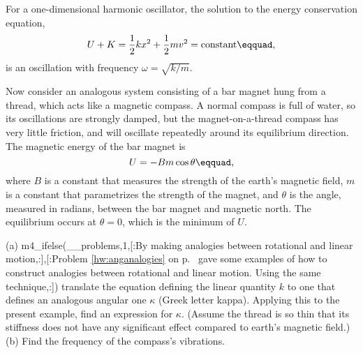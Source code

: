 For a one-dimensional harmonic oscillator, the solution to the
energy conservation equation,
\begin{equation*}
        U+K = \frac{1}{2}kx^2+\frac{1}{2}mv^2 = \text{constant}\eqquad,
\end{equation*}
is an oscillation with frequency $\omega=\sqrt{k/m}$.  

\noindent Now consider an analogous system consisting of a bar magnet hung from a thread,
which acts like a magnetic compass. A normal
compass is full of water, so its oscillations are strongly damped, but the
magnet-on-a-thread compass has very little friction, and will oscillate repeatedly
around its equilibrium direction. The magnetic energy of the bar magnet
is
\begin{equation*}
        U = -Bm\cos\theta\eqquad,
\end{equation*}
where $B$ is a constant that measures the strength of the earth's magnetic field,
$m$ is a constant that parametrizes the strength of the magnet, and
$\theta$ is the angle, measured in radians, 
between the bar magnet and magnetic north. The equilibrium
occurs at $\theta=0$, which is the minimum of $U$.

\noindent (a)
m4_ifelse(__problems,1,[:By making analogies between
rotational and linear motion,:],[:Problem \ref{hw:anganalogies} on p.~\pageref{hw:anganalogies}
gave some examples of how to construct
analogies between rotational and linear motion. 
Using the same technique,:])
translate the
equation defining the linear quantity $k$ to one that defines an analogous angular
one $\kappa$ (Greek letter kappa). Applying this to the present example, find an
expression for $\kappa$.
(Assume the thread is so thin that its stiffness does not have any significant
effect compared to earth's magnetic field.)\answercheck\hwendpart
(b) Find the frequency of the compass's vibrations.\answercheck
